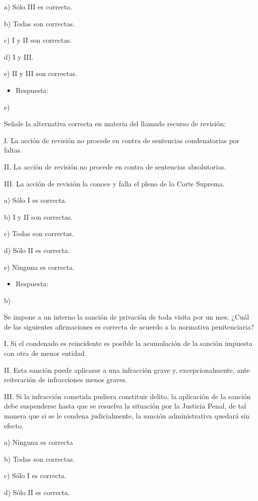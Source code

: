 \documentclass[letterpaper, 11pt]{article}
\begin{document}
a) Sólo III es correcta.

b) Todas son correctas.

c) I y II son correctas.

d) I y III.

e) II y III son correctas.

\begin{itemize}
\item Respuesta:
\end{itemize}
e)


Señale la alternativa correcta en materia del llamado recurso de revisión:

I. La acción de revisión no procede en contra de sentencias condenatorias por faltas.

II. La acción de revisión no procede en contra de sentencias absolutorias.

III. La acción de revisión la conoce y falla el pleno de la Corte Suprema.

a) Sólo I es correcta.

b) I y II son correctas.

c) Todas son correctas.

d) Sólo II es correcta.

e) Ninguna es correcta.

\begin{itemize}
\item Respuesta:
\end{itemize}
b)


Se impone a un interno la sanción de privación de toda visita por un mes. ¿Cuál de
las siguientes afirmaciones es correcta de acuerdo a la normativa penitenciaria?

I. Si el condenado es reincidente es posible la acumulación de la sanción impuesta
con otra de menor entidad.

II. Esta sanción puede aplicarse a una infracción grave y, excepcionalmente, ante
reiteración de infracciones menos graves.

III. Si la infracción cometida pudiera constituir delito, la aplicación de la sanción debe
suspenderse hasta que se resuelva la situación por la Justicia Penal, de tal manera
que si se le condena judicialmente, la sanción administrativa quedará sin efecto.

a) Ninguna es correcta

b) Todas son correctas.

c) Sólo I es correcta.

d) Sólo II es correcta.
\end{document}
